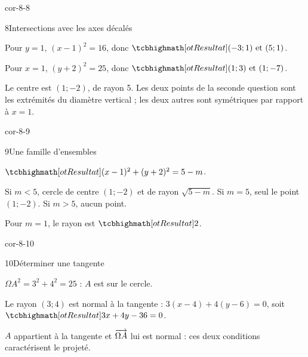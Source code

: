 \begin{blocLivre}{cor-8-8}
\begin{corrige}{8}{Intersections avec les axes décalés}
\begin{questions}
\item Pour $y=1$, $(x-1)^2=16$, donc $\res{(-3;1)\text{ et }(5;1)}$.
\item Pour $x=1$, $(y+2)^2=25$, donc $\res{(1;3)\text{ et }(1;-7)}$.
\item Le centre est $(1;-2)$, de rayon 5. Les deux points de la seconde question sont les extrémités du diamètre vertical ; les deux autres sont symétriques par rapport à $x=1$.
\end{questions}

\label{figgeo-08-08-cor}
\end{corrige}
\end{blocLivre}
\begin{blocLivre}{cor-8-9}
\begin{corrige}{9}{Une famille d'ensembles}
\begin{questions}
\item $\res{(x-1)^2+(y+2)^2=5-m}$.
\item Si $m<5$, cercle de centre $(1;-2)$ et de rayon $\sqrt{5-m}$. Si $m=5$, seul le point $(1;-2)$. Si $m>5$, aucun point.
\item Pour $m=1$, le rayon est $\res{2}$.
\end{questions}

\label{figgeo-08-09-cor}
\end{corrige}
\end{blocLivre}
\begin{blocLivre}{cor-8-10}
\begin{corrige}{10}{Déterminer une tangente}
\begin{questions}
\item $\Omega A^2=3^2+4^2=25$ : $A$ est sur le cercle.
\item Le rayon $(3;4)$ est normal à la tangente : $3(x-4)+4(y-6)=0$, soit $\res{3x+4y-36=0}$.
\item $A$ appartient à la tangente et $\overrightarrow{\Omega A}$ lui est normal : ces deux conditions caractérisent le projeté.
\end{questions}

\label{figgeo-08-10-cor}
\end{corrige}
\end{blocLivre}
